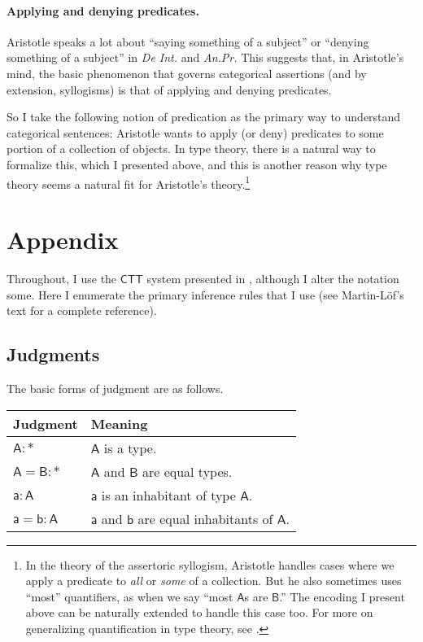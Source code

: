 \documentclass{article}
\newcommand\e{\mathsf}
\def\AnPr/{\emph{An.Pr.}}
\def\DeInterp/{\emph{De Int.}}
\def\CTT/{$\e{CTT}$}
\def\Type/{\e{*}}
\def\a/{\e{a}}
\def\b/{\e{b}}
\def\A/{\e{A}}
\def\B/{\e{B}}
\begin{document}
\paragraph{Applying and denying predicates.}

Aristotle speaks a lot about ``saying something of a subject'' or ``denying something of a subject'' in \DeInterp/ and \AnPr/ This suggests that, in Aristotle's mind, the basic phenomenon that governs categorical assertions (and by extension, syllogisms) is that of applying and denying predicates.

So I take the following notion of predication as the primary way to understand categorical sentences: Aristotle wants to apply (or deny) predicates to some portion of a collection of objects. In type theory, there is a natural way to formalize this, which I presented above, and this is another reason why type theory seems a natural fit for Aristotle's theory.\footnote{In the theory of the assertoric syllogism, Aristotle handles cases where we apply a predicate to \emph{all} or \emph{some} of a collection. But he also sometimes uses ``most'' quantifiers, as when we say ``most $\A/$s are $\B/$.'' The encoding I present above can be naturally extended to handle this case too. For more on generalizing quantification in type theory, see \citet{Sundholm1989}.}


\newpage
\appendix
\section{Appendix}

Throughout, I use the \CTT/ system presented in \citet{MartinLof1984}, although I alter the notation some. Here I enumerate the primary inference rules that I use (see Martin-L\"of's text for a complete reference).


\subsection{Judgments}

The basic forms of judgment are as follows.

\begin{center}
\begin{tabular}{l l}
  Judgment   & Meaning \\
  \hline
  $\A/ : \Type/$  & $\A/$ is a type. \\
  $\A/ = \B/ : \Type/$  & $\A/$ and $\B/$ are equal types. \\
  $\a/ : \A/$ & $\a/$ is an inhabitant of type $\A/$. \\
  $\a/ = \b/ : \A/$ & $\a/$ and $\b/$ are equal inhabitants of $\A/$.
\end{tabular}
\end{center}
\end{document}
